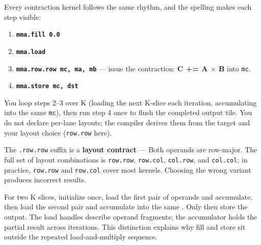 Every contraction kernel follows the same rhythm, and the spelling makes each step visible:

\begin{enumerate}[leftmargin=1.6em]
\item \textbf{\texttt{mma.fill 0.0}}
\item \textbf{\texttt{mma.load}}
\item \textbf{\texttt{mma.\allowbreak{}row.\allowbreak{}row mc, ma, mb}} --- issue the contraction: \textbf{C += A \(\times\) B} into \texttt{mc}.
\item \textbf{\texttt{mma.\allowbreak{}store mc, dst}}
\end{enumerate}

You loop steps 2--3 over K (loading the next K-slice each iteration, accumulating into the same \texttt{mc}), then run step 4 once to flush the completed output tile. You do not declare per-lane layouts; the compiler derives them from the target and your layout choice (\texttt{row.row} here).

The \texttt{.row.row} suffix is a \textbf{layout contract} --- Both operands are row-major. The full set of layout combinations is \texttt{row.row}, \texttt{row.col}, \texttt{col.row}, and \texttt{col.col}; in practice, \texttt{row.row} and \texttt{row.col} cover most kernels. Choosing the wrong variant produces incorrect results.

For two K slices, initialize \co@mc@ once, load the first pair of operands and accumulate, then load the second pair and accumulate into the same \co@mc@. Only then store the output. The load handles describe operand fragments; the accumulator holds the partial result across iterations. This distinction explains why fill and store sit outside the repeated load-and-multiply sequence.
